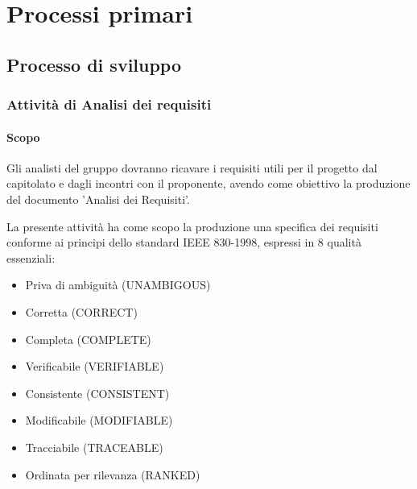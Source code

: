 
\chapter{Processi primari}
	\section{Processo di sviluppo}
		\subsection{Attività di Analisi dei requisiti}
			\subsubsection{Scopo}
				Gli analisti del gruppo dovranno ricavare i requisiti utili per il progetto
				dal capitolato e dagli incontri con il proponente, avendo come obiettivo la
				produzione del documento 'Analisi dei Requisiti'.
			
			La presente attività ha come scopo la produzione una specifica dei
			requisiti conforme ai principi dello standard IEEE 830-1998, espressi in 8 qualità
			essenziali:
				\begin{itemize}
				\item Priva di ambiguità (UNAMBIGOUS)
				\item Corretta (CORRECT)
				\item Completa (COMPLETE)
				\item Verificabile (VERIFIABLE)
				\item Consistente (CONSISTENT)
				\item Modificabile (MODIFIABLE)
				\item Tracciabile (TRACEABLE)
				\item Ordinata per rilevanza (RANKED)
				\end{itemize}
			

